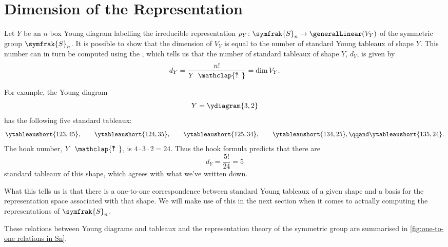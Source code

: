 \documentclass[fleqn]{NotesClass}
\newcommand{\symmetricGroup}[1][n]{\symfrak{S}_{#1}}
\newcommand{\hooknumber}[1]{#1{\phantom{?}\mkern1mu\mathclap{\ooalign{\hfil ? \hfil \cr \hfil ! \hfil}}}}
\begin{document}
    \section{Dimension of the Representation}
    Let \(Y\) be an \(n\) box Young diagram labelling the irreducible representation \(\rho_Y\colon \symmetricGroup \to \generalLinear(V_Y)\) of the symmetric group \(\symmetricGroup\).
    It is possible to show that the dimension of \(V_Y\) is equal to the number of standard Young tableaux of shape \(Y\).
    This number can in turn be computed using the  \cite[88]{cvitanovic}, which tells us that the number of standard tableaux of shape \(Y\), \(d_Y\), is given by
    \begin{equation}
        d_Y = \frac{n!}{\hooknumber{Y}} = \dim V_Y.
    \end{equation}
    
    For example, the Young diagram
    \begin{equation}
        Y = \ydiagram{3,2}
    \end{equation}
    has the following five standard tableaux:
    \begin{equation}
        \ytableaushort{123,45}, \qquad \ytableaushort{124,35}, \qquad \ytableaushort{125,34}, \qquad \ytableaushort{134,25}, \qqand \ytableaushort{135,24}.
    \end{equation}
    The hook number, \(\hooknumber{Y}\), is \(4 \cdot 3 \cdot 2 = 24\).
    Thus the hook formula predicts that there are
    \begin{equation}
        d_Y = \frac{5!}{24} = 5
    \end{equation}
    standard tableaux of this shape, which agrees with what we've written down.
    
    What this tells us is that there is a one-to-one correspondence between standard Young tableaux of a given shape and a basis for the representation space associated with that shape.
    We will make use of this in the next section when it comes to actually computing the representations of \(\symmetricGroup\).
    
    These relations between Young diagrams and tableaux and the representation theory of the symmetric group are summarised in \cref{fig:one-to-one relations in Sn}.
    
\end{document}

